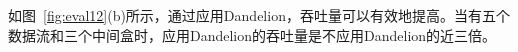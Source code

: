 \documentclass{ctexart}
\newcommand{\para}[1]{\noindent {\bf #1}}%
\begin{document}

如图~\ref{fig:eval12}(b)所示，通过应用Dandelion，吞吐量可以有效地提高。当有五个数据流和三个中间盒时，应用Dandelion的吞吐量是不应用Dandelion的近三倍。

\end{document}
